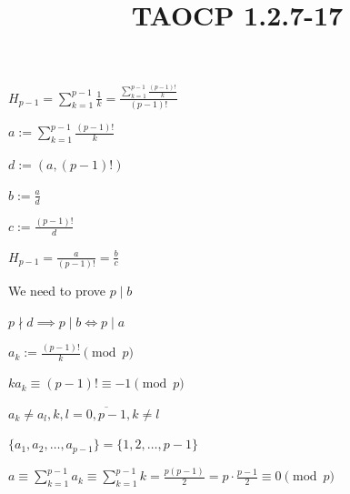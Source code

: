 \documentclass{article}
\title{TAOCP 1.2.7\mbox{-}17}
\begin{document}
\maketitle

\( H_{p-1} = \sum_{k=1}^{p-1}\frac{1}{k} = \frac{\sum_{k=1}^{p-1}\frac{(p-1)!}{k}}{(p-1)!} \)

\( a := \sum_{k=1}^{p-1}\frac{(p-1)!}{k} \)

\( d := (a, (p-1)!) \)

\( b := \frac{a}{d} \)

\( c := \frac{(p-1)!}{d} \)

\( H_{p-1} = \frac{a}{(p-1)!} = \frac{b}{c} \)

We need to prove \( p \mid b \)

\( p \nmid d \implies p \mid b \iff p \mid a \)

\( a_{k} := \frac{(p-1)!}{k} \pmod p \)

\( k a_{k} \equiv (p-1)! \equiv -1 \pmod p \)

\( a_{k} \neq a_{l}, k,l=\overline{0,p-1}, k \neq l \)

\( \{ a_{1}, a_{2}, \ldots, a_{p-1} \} = \{ 1,2,\ldots, p - 1\} \)

\( a \equiv \sum_{k=1}^{p-1} a_{k} \equiv \sum_{k=1}^{p-1} k = \frac{p(p-1)}{2} = p \cdot \frac{p-1}{2} \equiv 0 \pmod p \)
\end{document}
